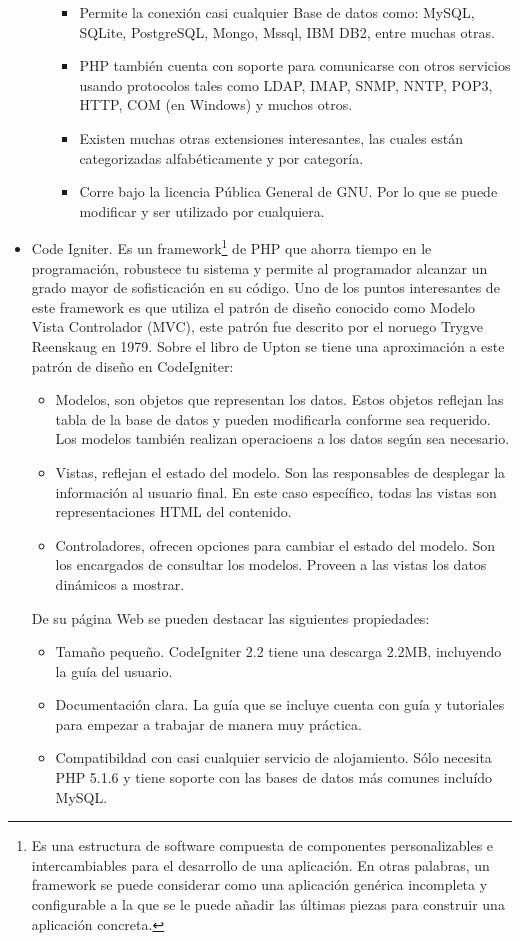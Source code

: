 \begin{itemize}
\begin{itemize}
\begin{itemize}
					\item Permite la conexión casi cualquier Base de datos como: MySQL, SQLite, PostgreSQL, Mongo, Mssql, IBM DB2, entre muchas otras.
					\item PHP también cuenta con soporte para comunicarse con otros servicios usando protocolos tales como LDAP, IMAP, SNMP, NNTP, POP3, HTTP, COM (en Windows) y muchos otros.
					\item Existen muchas otras extensiones interesantes, las cuales están categorizadas alfabéticamente y por categoría.
		 			\item Corre bajo la licencia Pública General de GNU. Por lo que se puede modificar y ser utilizado por cualquiera.
		 		\end{itemize}

	\end{itemize}

	
	\item Code Igniter. Es un framework\footnote{Es una estructura de software compuesta de componentes personalizables e intercambiables para el desarrollo de una aplicación. En otras palabras, un framework se puede considerar como
una aplicación genérica incompleta y configurable a la que se le puede añadir las últimas piezas para construir una aplicación concreta.} de PHP que ahorra tiempo en le programación, robustece tu sistema y permite al programador alcanzar un grado mayor de sofisticación en su código. Uno de los puntos interesantes de este framework es que utiliza el patrón de diseño conocido como Modelo Vista Controlador (MVC), este patrón fue descrito por el noruego Trygve Reenskaug en 1979. 
	Sobre el libro de Upton \cite{upton2007codeigniter} se tiene una aproximación a este patrón de diseño en CodeIgniter:
	\begin{itemize}
		\item Modelos, son objetos que representan los datos. Estos objetos reflejan las tabla de la base de datos y pueden modificarla conforme sea requerido. Los modelos también realizan operacioens a los datos según sea necesario.
		\item Vistas, reflejan el estado del modelo. Son las responsables de desplegar la información al usuario final. En este caso específico, todas las vistas son representaciones HTML del contenido.
		\item Controladores, ofrecen opciones para cambiar el estado del modelo. Son los encargados de consultar los modelos. Proveen a las vistas los datos dinámicos a mostrar.
	\end{itemize}
	De su página Web \cite{codeigniterWeb} se pueden destacar las siguientes propiedades:
	\begin{itemize}
		\item Tamaño pequeño. CodeIgniter 2.2 tiene una descarga 2.2MB, incluyendo la guía del usuario.
		\item Documentación clara. La guía que se incluye cuenta con guía y tutoriales para empezar a trabajar de manera muy práctica.
		\item Compatibildad con casi cualquier servicio de alojamiento. Sólo necesita PHP 5.1.6 y tiene soporte con las bases de datos más comunes incluído MySQL.
		

\end{itemize}
\end{itemize}
